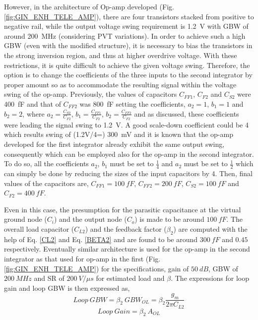However, in the architecture of Op-amp developed (Fig. \ref{fig:GIN_ENH_TELE_AMP}), there are four transistors stacked from positive to negative rail, while the output voltage swing requirement is 1.2~V with GBW of around 200~MHz (considering PVT variations). In order to achieve such a high GBW (even with the modified structure), it is necessary to bias the transistors in the strong inversion region, and thus at higher overdrive voltage. With these restrictions, it is quite difficult to achieve the given voltage swing. Therefore, the option is to change the coefficients of the three inputs to the second integrator by proper amount so as to accommodate the resulting signal within the voltage swing of the op-amp. Previously, the values of capacitors $C_{FF1}$, $C_{F2}$ and $C_{S2}$ were 400~fF and that of $C_{FF2}$ was 800~fF setting the coefficients, $a_2=1$, $b_1=1$ and $b_2=2$, where $a_2=\frac{C_{S2}}{C_{F2}}$, $b_1=\frac{C_{FF1}}{C_{F2}}$, $b_2=\frac{C_{FF2}}{C_{F2}}$ and as discussed, these coefficients were leading the signal swing to 1.2~V. A good scale-down coefficient could be 4 which results swing of (1.2V/4=) 300~mV and it is known that the op-amp developed for the first integrator already exhibit the same output swing, consequently which can be employed also for the op-amp in the second integrator. To do so, all the coefficients $a_2$, $b_1$ must be set to $\frac{1}{4}$ and $a_2$ must be set to $\frac{1}{2}$ which can simply be done by reducing the sizes of the input capacitors by 4. Then, final values of the capacitors are, $C_{FF1}=100~fF$, $C_{FF2}=200~fF$, $C_{S2}=100~fF$ and $C_{F2}=400~fF$.


Even in this case, the presumption for the parasitic capacitance at the virtual ground node ($C_{i}$) and the output node ($C_{o}$) is made to be around $100\ fF$. The overall load capacitor ($C_{L2}$) and the feedback factor ($\beta_2$) are computed with the help of Eq. \ref{CL2} and Eq. \ref{BETA2} and are found to be around $300~fF$ and $0.45$ respectively. Eventually similar architecture is used for the op-amp in the second integrator as that used for op-amp in the first (Fig. \ref{fig:GIN_ENH_TELE_AMP}) for the specifications, gain of $50~dB$, GBW of $200~MHz$ and SR of $200~V/\mu s$ for estimated load and $\beta$. The expressions for loop gain and loop GBW is then expressed as,
%
\begin{equation}
    Loop\ GBW = \beta_2 \ GBW_{OL} = \beta_2 \frac{g_m}{2\pi C_{L2}}
\end{equation}
%
%
\begin{equation}
    Loop\ Gain = \beta_2\ A_{OL}
\end{equation}
%
